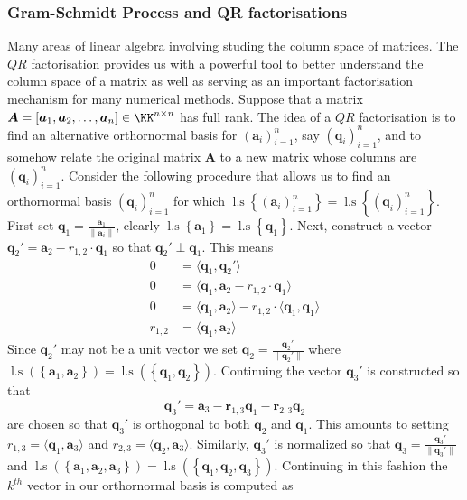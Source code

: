 \subsubsection{Gram-Schmidt Process and QR factorisations}\label{Section1.1.2}

Many areas of linear algebra involving studing the column space of matrices. The $QR$ factorisation provides us with a powerful tool to better understand the column space of a matrix as well as serving as an important factorisation mechanism for many numerical methods. Suppose that a matrix $\bm{A} = \left[ \bm{a}_1 , \bm{a}_2 , \ldots , \bm{a}_n \right] \in \KK^{n \times n}$ has full rank. The idea of a $QR$ factorisation is to find an alternative orthornormal basis for $\left( \bm{a}_i \right)_{i=1}^{n}$, say $\left( \bm{q}_i \right)_{i=1}^{n}$, and to somehow relate the original matrix $\bm{A}$ to a new matrix whose columns are $\left( \bm{q}_i \right)_{i=1}^{n}$. Consider the following procedure that allows us to find an orthornormal basis $\left( \bm{q}_i \right)_{i=1}^{n}$ for which $\operatorname{l.s} \left\{ \left( \bm{a}_i \right)_{i=1}^{n} \right\} = \operatorname{l.s} \left\{ \left( \bm{q}_i \right)_{i=1}^{n} \right\}$. First set $\bm{q}_1 = \frac{\bm{a}_1}{\| \bm{a}_i \|}$, clearly $\operatorname{l.s} \left\{ \bm{a}_1 \right\} = \operatorname{l.s} \left\{ \bm{q}_1 \right\}$. Next, construct a vector $\bm{q}_2' = \bm{a}_2 - r_{1,2} \cdot \bm{q}_1$ so that $\bm{q}_2' \perp \bm{q}_1$. This means
\begin{align*}
    0       & = \langle \bm{q}_1, \bm{q}_2' \rangle                                                   \\
    0       & = \langle \bm{q}_1, \bm{a}_2 - r_{1,2} \cdot \bm{q}_1 \rangle                           \\
    0       & = \langle \bm{q}_1, \bm{a}_2 \rangle - r_{1,2} \cdot \langle \bm{q}_1, \bm{q}_1 \rangle \\
    r_{1,2} & = \langle \bm{q}_1, \bm{a}_2 \rangle
\end{align*}
Since $\bm{q}_2'$ may not be a unit vector we set $\bm{q}_2 = \frac{\bm{q}_2'}{\| \bm{q}_2' \|}$ where $\operatorname{l.s} \left( \left\{ \bm{a}_1, \bm{a}_2 \right\} \right) = \operatorname{l.s} \left( \left\{ \bm{q}_1, \bm{q}_2 \right\} \right)$. Continuing the vector $\bm{q}_3'$ is constructed so that
\[
    \bm{q}_3' = \bm{a}_3 - \bm{r}_{1,3} \bm{q}_1 - \bm{r}_{2,3} \bm{q}_2
\]
are chosen so that $\bm{q}_3'$ is orthogonal to both $\bm{q}_2$ and $\bm{q}_1$. This amounts to setting $r_{1,3} = \langle \bm{q}_1, \bm{a}_3 \rangle$ and $r_{2,3} = \langle \bm{q}_2, \bm{a}_{3} \rangle$. Similarly, $\bm{q}_3'$ is normalized so that $\bm{q}_3 = \frac{\bm{q}_3'}{\| \bm{q}_3' \|}$ and $\operatorname{l.s} \left( \left\{ \bm{a}_1, \bm{a}_2, \bm{a}_3 \right\} \right) = \operatorname{l.s} \left( \left\{ \bm{q}_1, \bm{q}_2, \bm{q}_3 \right\} \right)$. Continuing in this fashion the $k^{th}$ vector in our orthornormal basis is computed as
